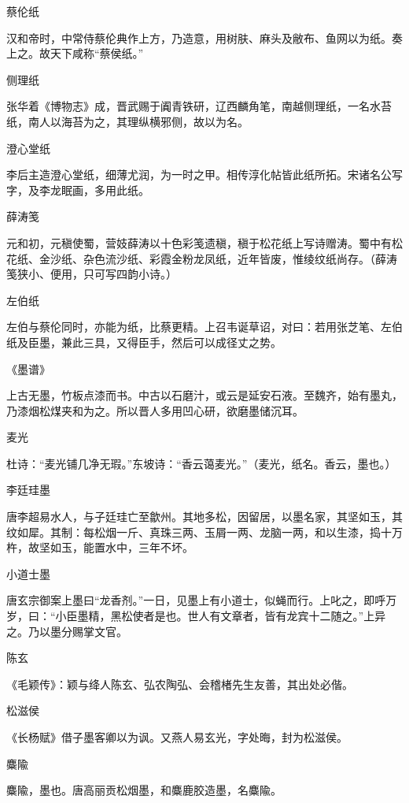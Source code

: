 \documentclass[a4paper,12pt,UTF8,twoside]{ctexbook}
\begin{document}
    蔡伦纸
    
    汉和帝时，中常侍蔡伦典作上方，乃造意，用树肤、麻头及敝布、鱼网以为纸。奏上之。故天下咸称“蔡侯纸。”
    
    侧理纸
    
    张华着《博物志》成，晋武赐于阗青铁研，辽西麟角笔，南越侧理纸，一名水苔纸，南人以海苔为之，其理纵横邪侧，故以为名。
    
    澄心堂纸
    
    李后主造澄心堂纸，细薄尤润，为一时之甲。相传淳化帖皆此纸所拓。宋诸名公写字，及李龙眠画，多用此纸。
    
    薛涛笺
    
    元和初，元稹使蜀，营妓薛涛以十色彩笺遗稹，稹于松花纸上写诗赠涛。蜀中有松花纸、金沙纸、杂色流沙纸、彩霞金粉龙凤纸，近年皆废，惟绫纹纸尚存。（薛涛笺狭小、便用，只可写四韵小诗。）
    
    左伯纸
    
    左伯与蔡伦同时，亦能为纸，比蔡更精。上召韦诞草诏，对曰：若用张芝笔、左伯纸及臣墨，兼此三具，又得臣手，然后可以成径丈之势。
    
    《墨谱》
    
    上古无墨，竹板点漆而书。中古以石磨汁，或云是延安石液。至魏齐，始有墨丸，乃漆烟松煤夹和为之。所以晋人多用凹心研，欲磨墨储沉耳。
    
    麦光
    
    杜诗：“麦光铺几净无瑕。”东坡诗：“香云蔼麦光。”（麦光，纸名。香云，墨也。）
    
    李廷珪墨
    
    唐李超易水人，与子廷珪亡至歙州。其地多松，因留居，以墨名家，其坚如玉，其纹如犀。其制：每松烟一斤、真珠三两、玉屑一两、龙脑一两，和以生漆，捣十万杵，故坚如玉，能置水中，三年不坏。
    
    小道士墨
    
    唐玄宗御案上墨曰“龙香剂。”一日，见墨上有小道士，似蝇而行。上叱之，即呼万岁，曰：“小臣墨精，黑松使者是也。世人有文章者，皆有龙宾十二随之。”上异之。乃以墨分赐掌文官。
    
    陈玄
    
    《毛颖传》：颖与绛人陈玄、弘农陶弘、会稽楮先生友善，其出处必偕。
    
    松滋侯
    
    《长杨赋》借子墨客卿以为讽。又燕人易玄光，字处晦，封为松滋侯。
    
    麋隃
    
    麋隃，墨也。唐高丽贡松烟墨，和麋鹿胶造墨，名麋隃。
    
\end{document}
